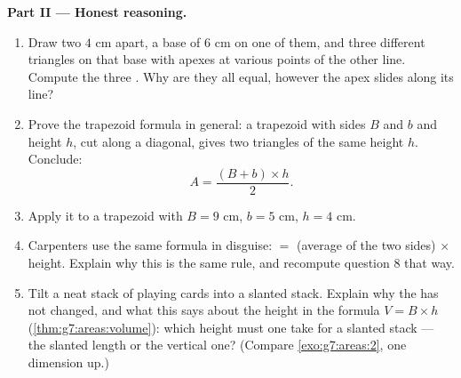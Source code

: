 \begin{problem}[{Weekend problem --- a famous ``proof'' that
$64 = 65$, unmasked by areas and slopes, with pizzas and rings for
dessert}]
\medskip
\noindent\textbf{Part II --- Honest  reasoning.}
\begin{enumerate}[resume]
  \item Draw two  $4$ cm apart, a base of $6$ cm on
        one of them, and three different triangles on that base
        with apexes at various points of the other line. Compute
        the three . Why are they all equal, however the apex
        slides along its line?
  \item Prove the trapezoid formula in general: a trapezoid with
         sides $B$ and $b$ and height $h$, cut along a
        diagonal, gives two triangles of the same height $h$.
        Conclude:
        \[
        A = \frac{(B + b) \times h}{2} .
        \]
  \item Apply it to a trapezoid with $B = 9$ cm, $b = 5$ cm,
        $h = 4$ cm.
  \item Carpenters use the same formula in disguise:  $=$
        (average of the two  sides) $\times$ height.
        Explain why this is the same rule, and recompute question
        8 that way.
  \item Tilt a neat stack of playing cards into a slanted stack.
        Explain why the  has not changed, and what this
        says about the height in the  formula
        $V = B \times h$ (\cref{thm:g7:areas:volume}): which
        height must one take for a slanted stack --- the slanted
        length or the vertical one? (Compare
        \cref{exo:g7:areas:2}, one dimension up.)
\end{enumerate}


\end{problem}
